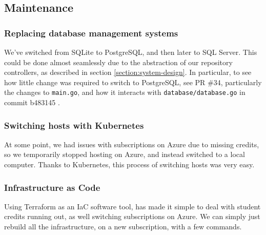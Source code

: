 \subsection{Maintenance}

\subsubsection{Replacing database management systems}

We've switched from SQLite to PostgreSQL, and then later to SQL Server. This could be done almost seamlessly due to the abstraction of our repository controllers, as described in section \ref{section:system-design}.
In particular, to see how little change was required to switch to PostgreSQL, see PR \#34, particularly the changes to \texttt{main.go}, and how it interacts with \texttt{database/database.go} in commit b483145 \cite{commit:switching-to-psql}.


\subsubsection{Switching hosts with Kubernetes}

At some point, we had issues with subscriptions on Azure due to missing credits, so we temporarily stopped hosting on Azure, and instead switched to a local computer. Thanks to Kubernetes, this process of switching hosts was very easy.


\subsubsection{Infrastructure as Code}

Using Terraform as an IaC software tool, has made it simple to deal with student credits running out, as well switching subscriptions on Azure. We can simply just rebuild all the infrastructure, on a new subscription, with a few commands.
